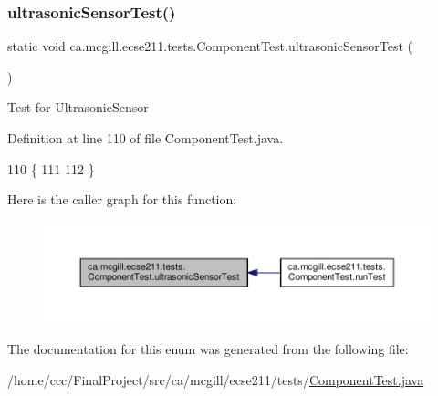 \subsubsection{\texorpdfstring{ultrasonic\+Sensor\+Test()}{ultrasonicSensorTest()}}
{\footnotesize\ttfamily static void ca.\+mcgill.\+ecse211.\+tests.\+Component\+Test.\+ultrasonic\+Sensor\+Test (\begin{DoxyParamCaption}{ }\end{DoxyParamCaption})\hspace{0.3cm}{\ttfamily [static]}}

Test for Ultrasonic\+Sensor 

Definition at line 110 of file Component\+Test.\+java.


\begin{DoxyCode}
110                                             \{
111 
112   \}
\end{DoxyCode}
Here is the caller graph for this function\+:
\nopagebreak
\begin{figure}[H]
\begin{center}
\leavevmode
\includegraphics[width=350pt]{enumca_1_1mcgill_1_1ecse211_1_1tests_1_1_component_test_a05cd9d95458b11ed57ca001a28fffa7c_icgraph}
\end{center}
\end{figure}


The documentation for this enum was generated from the following file\+:\begin{DoxyCompactItemize}
\item 
/home/ccc/\+Final\+Project/src/ca/mcgill/ecse211/tests/\hyperlink{_component_test_8java}{Component\+Test.\+java}\end{DoxyCompactItemize}
